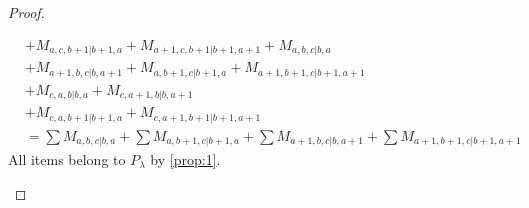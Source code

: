 \begin{proof}
\begin{enumerate}
\begin{enumerate}
\begin{equation}
\begin{aligned}
                                              &
+ M_{a,c,b+1|b+1,a}
+ M_{a+1,c,b+1|b+1,a+1}
+ M_{a,b,c|b,a}\\
                                              &
+ M_{a+1,b,c|b,a+1}
+ M_{a,b+1,c|b+1,a}
+ M_{a+1,b+1,c|b+1,a+1}\\
                                              &
+ M_{c,a,b|b,a}
+ M_{c,a+1,b|b,a+1}\\
                                              &
+ M_{c,a,b+1|b+1,a}
+ M_{c,a+1,b+1|b+1,a+1} \\
                                               &=
\sum M_{a,b,c|b,a}
+ \sum M_{a,b+1,c|b+1,a}
+ \sum M_{a+1,b,c|b,a+1}
+ \sum M_{a+1,b+1,c|b+1,a+1}
          \end{aligned}
        \end{equation}
All items belong to $P_\lambda$ by \cref{prop:1}.


\end{enumerate}
\end{enumerate}
\end{proof}
